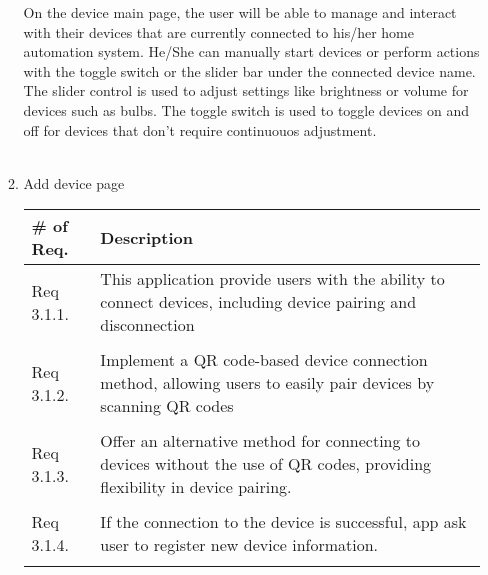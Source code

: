 \begin{enumerate}[label=\arabic*.]
\begin{enumerate}[label*={\arabic*.},ref=\theenumi.\arabic*]

                    On the device main page, the user will be able to manage and interact with their devices that are currently connected to his/her home automation system. He/She can manually start devices or perform actions with the toggle switch or the slider bar under the connected device name. The slider control is used to adjust settings like brightness or volume for devices such as bulbs. The toggle switch is used to toggle devices on and off for devices that don't require continuouos adjustment.  \\\\
                    \newpage
              \item Add device page
                    \begin{table}[H]
                        \center
                        \begin{tabular}{m{1.4cm} m{5.5cm}}
                            \toprule
                            \# of Req. & Description                                                                                                                 \\
                            \midrule
                            Req 3.1.1. & This application provide users with the ability to connect devices, including device pairing and disconnection              \\\\
                            Req 3.1.2. & Implement a QR code-based device connection method, allowing users to easily pair devices by scanning QR codes              \\\\
                            Req 3.1.3. & Offer an alternative method for connecting to devices without the use of QR codes, providing flexibility in device pairing. \\\\
                            Req 3.1.4. & If the connection to the device is successful, app ask user to register new device information.                             \\\\
                            \bottomrule
                        \end{tabular}
                    \end{table}


\end{enumerate}
\end{enumerate}
